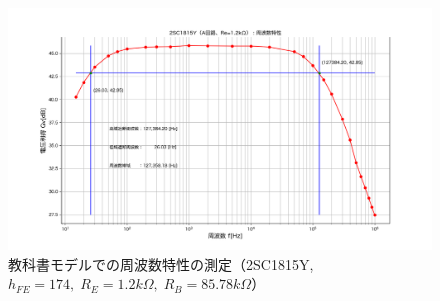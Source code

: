 \documentclass[uplatex,a4paper,11pt,oneside,openany]{jsbook}
\begin{document}
\newpage

\begin{figure}[H]
  \centering
   \includegraphics[keepaspectratio, scale=0.65, angle=90]
               {figs/png/freqcharM1Y1_2kR.png}
               \caption{教科書モデルでの周波数特性の測定（2SC1815Y, $h_{FE}=174,\;R_E=1.2k\Omega,\;R_B=85.78k\Omega$）}
               \label{fig:9_2_2}
\end{figure}

\newpage

\end{document}
